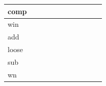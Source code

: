 \documentclass{article}[10 pt,landscape]
\begin{document}
\begin{landscape}
{\begin{tabular}{l|l|l|l|l|l|l|l|l|l|l}
comp  &       &       &       & 	      &         &       &       &        &       & \\ \hline
win   &       &       &       & 	      &         &       &       &        &       & \\ \hline
add   &       &       &       & 	      &         &       &       &        &       & \\ \hline
loose &       &       &       & 	      &         &       &       &        &       & \\ \hline
sub &       &       &       & 	      &         &       &       &        &       & \\ \hline
wn    &       &       &       & 	      &         &       &       &        &       & \\ 
\end{tabular}
}
\end{landscape}
\end{document}
